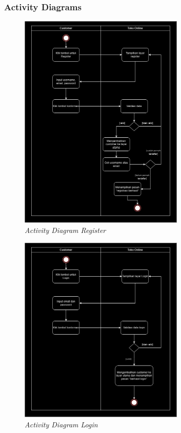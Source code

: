 \documentclass[journal,article,submit,pdftex,moreauthors]{Definitions/mdpi}
\begin{document}
\subsubsection{Activity Diagrams}

\begin{figure}[H]
    \centering
    \includegraphics[width=0.7\textwidth]{images/activityregistersdiagram.png}
    \captionsetup{justification=centering}
    \caption{\textit{Activity Diagram Register}}
    \label{fig:activity-register}
\end{figure}

\begin{figure}[H]
    \centering
    \includegraphics[width=0.7\textwidth]{images/acitivtylogindiagram.png}
    \captionsetup{justification=centering}
    \caption{\textit{Activity Diagram Login}}
    \label{fig:activity-login}
\end{figure}
\end{document}
